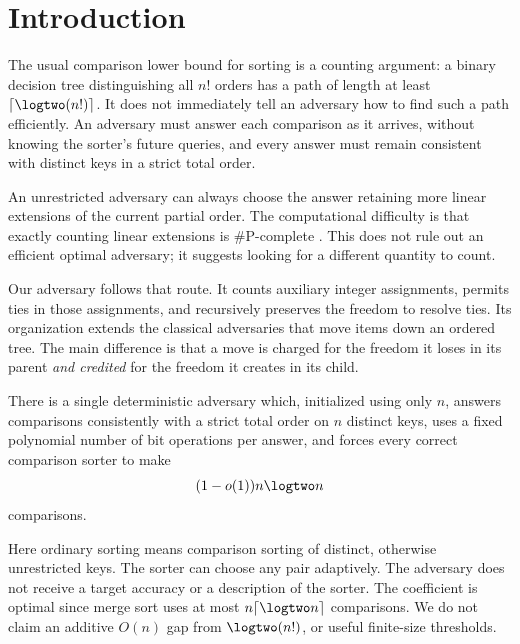 \section{Introduction}
\label{sec:introduction}

The usual comparison lower bound for sorting is a counting argument: a binary
decision tree distinguishing all $n!$ orders has a path of length at least
$\lceil\logtwo(n!)\rceil$. It does not immediately tell an adversary how to
find such a path efficiently. An adversary must answer each comparison as it
arrives, without knowing the sorter's future queries, and every answer must
remain consistent with distinct keys in a strict total order.

An unrestricted adversary can always choose the answer retaining more linear
extensions of the current partial order. The computational difficulty is that
exactly counting linear extensions is $\#\mathrm P$-complete
\citep{BrightwellWinkler1991}. This does not rule out an efficient optimal
adversary; it suggests looking for a different quantity to count.

Our adversary follows that route. It counts auxiliary integer assignments,
permits ties in those assignments, and recursively preserves the freedom to
resolve ties. Its organization extends the classical adversaries that move
items down an ordered tree. The main difference is that a move is charged for
the freedom it loses in its parent \emph{and credited} for the freedom it
creates in its child.

\begin{samepage}
\begin{theorem}
\label{thm:main}
There is a single deterministic adversary which, initialized using only $n$,
answers comparisons consistently with a strict total order on $n$ distinct
keys, uses a fixed polynomial number of bit operations per answer, and forces
every correct comparison sorter to make
\[
                         (1-o(1))n\logtwo n
\]
comparisons.
\end{theorem}
\end{samepage}

Here ordinary sorting means comparison sorting of distinct, otherwise
unrestricted keys. The sorter can choose any pair adaptively. The adversary
does not receive a target accuracy or a description of the sorter. The
coefficient is optimal since merge sort uses at most $n\lceil\logtwo n\rceil$
comparisons. We do not claim an additive $O(n)$ gap from $\logtwo(n!)$, or
useful finite-size thresholds.

